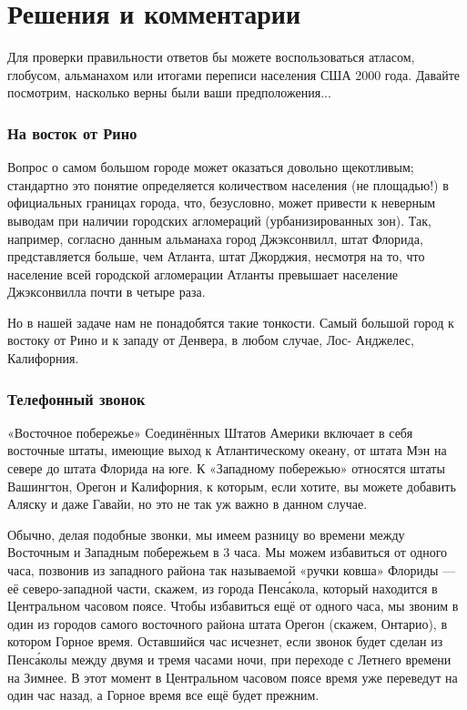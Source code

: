 \section*{Решения и комментарии}


Для проверки правильности ответов  бы можете воспользоваться атласом, глобусом, альманахом  или итогами переписи населения США 2000 года. 
Давайте посмотрим, насколько верны были ваши предположения...


\subsubsection*{На восток от Рино}%


Вопрос о самом большом городе может оказаться довольно щекотливым; 
стандартно  это понятие определяется количеством  населения (не площадью!) в официальных границах города, что, безусловно, может привести к неверным выводам
при наличии  городских агломераций (урбанизированных зон).
Так, например, согласно данным альманаха город Джэксонвилл, штат Флорида, представляется больше, чем Атланта, штат Джорджия,  несмотря на то, что население всей городской агломерации Атланты превышает население Джэксонвилла почти в четыре раза.


Но в нашей задаче нам не понадобятся такие тонкости. Самый большой город к востоку от Рино  и к западу от Денвера, в любом случае, Лос- Анджелес, Калифорния.                                                                                                                                  \heart






\subsubsection*{Телефонный звонок}%


«Восточное побережье»  Соединённых Штатов Америки включает в себя  восточные штаты, имеющие выход к Атлантическому океану,  от штата Мэн на севере до штата Флорида на юге. 
К «Западному  побережью»  относятся штаты Вашингтон, Орегон и Калифорния,
к  которым, если хотите, вы можете добавить Аляску и даже Гавайи,  но это не так уж важно в данном случае. %


Обычно, делая подобные звонки, мы имеем разницу во времени между Восточным и Западным побережьем в 3 часа.  Мы можем избавиться от одного часа, позвонив из  западного района так называемой  «ручки ковша» Флориды --- её северо-западной части, %
скажем, из города Пенс\'акола, который находится в  Центральном часовом поясе.  
Чтобы избавиться ещё от одного часа, мы звоним в один из городов самого  восточного района  штата Орегон (скажем, Онтарио),  в котором Горное время. 
Оставшийся час исчезнет, если звонок будет сделан  из Пенс\'аколы между двумя и тремя часами ночи, при переходе с Летнего времени на Зимнее. 
В этот момент в Центральном часовом поясе время уже переведут на один  час назад, а Горное время все ещё  будет прежним.\heart   


